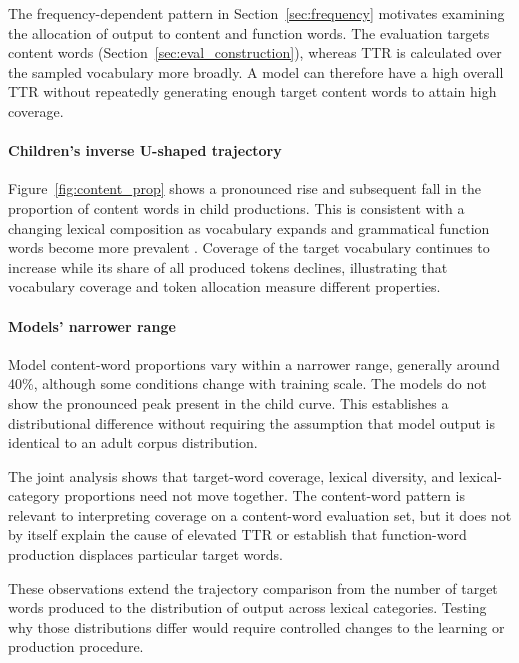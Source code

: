 The frequency-dependent pattern in Section~\ref{sec:frequency} motivates examining the allocation of output to content and function words. The \meCDI{} evaluation targets content words (Section~\ref{sec:eval_construction}), whereas TTR is calculated over the sampled vocabulary more broadly. A model can therefore have a high overall TTR without repeatedly generating enough target content words to attain high \meCDI{} coverage.


\paragraph{Children's inverse U-shaped trajectory} Figure~\ref{fig:content_prop} shows a pronounced rise and subsequent fall in the proportion of content words in child productions. This is consistent with a changing lexical composition as vocabulary expands and grammatical function words become more prevalent \citep{bates1994developmental,brown1973first}. Coverage of the target vocabulary continues to increase while its share of all produced tokens declines, illustrating that vocabulary coverage and token allocation measure different properties.

\paragraph{Models' narrower range}

Model content-word proportions vary within a narrower range, generally around 40\%, although some conditions change with training scale. The models do not show the pronounced peak present in the child curve. This establishes a distributional difference without requiring the assumption that model output is identical to an adult corpus distribution.

The joint analysis shows that target-word coverage, lexical diversity, and lexical-category proportions need not move together. The content-word pattern is relevant to interpreting coverage on a content-word evaluation set, but it does not by itself explain the cause of elevated TTR or establish that function-word production displaces particular target words.

These observations extend the trajectory comparison from the number of target words produced to the distribution of output across lexical categories. Testing why those distributions differ would require controlled changes to the learning or production procedure.



